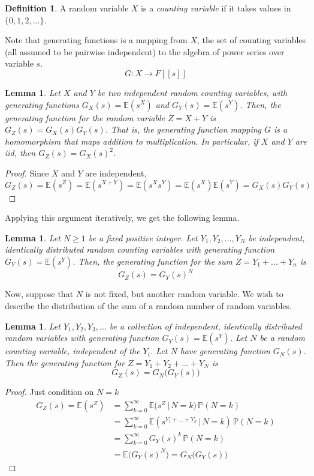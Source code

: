 \documentclass{article}
\newtheorem{lemma}[theorem]{Lemma}
\theoremstyle{remark}
\theoremstyle{definition}
\newtheorem{definition}{Definition}[section]
\begin{document}
\begin{definition}
A random variable $X$ is a \textit{counting variable} if it takes values in $\{0, 1, 2, ...\}$. 
\end{definition}

Note that generating functions is a mapping from $X$, the set of counting variables (all assumed to be pairwise independent) to the algebra of power series over variable $s$.
\[G: X \longrightarrow F[[s]]\]

\begin{lemma}
Let $X$ and $Y$ be two independent random counting variables, with generating functions $G_X (s) = \mathbb{E}(s^X)$ and $G_Y (s) = \mathbb{E}(s^Y)$. Then, the generating function for the random variable $Z = X + Y$ is $G_Z(s) = G_X (s) G_Y (s)$. That is, the generating function mapping $G$ is a homomorphism that maps addition to multiplication. In particular, if $X$ and $Y$ are iid, then $G_Z (s) = G_X (s)^2$. 
\end{lemma}
\begin{proof}
Since $X$ and $Y$ are independent, 
\[G_Z (s) = \mathbb{E}(s^Z) = \mathbb{E}(s^{X+Y}) = \mathbb{E}(s^X s^Y) = \mathbb{E}(s^X) \mathbb{E}(s^Y) = G_X (s) G_Y (s)\]
\end{proof}

Applying this argument iteratively, we get the following lemma. 
\begin{lemma}
Let $N \geq 1$ be a fixed positive integer. Let $Y_1, Y_2, ..., Y_N$ be independent, identically distributed random counting variables with generating function $G_Y (s) = \mathbb{E}(s^Y)$. Then, the generating function for the sum $Z = Y_1 + ... + Y_n$ is 
\[G_Z (s) = G_Y (s)^N\]
\end{lemma}

Now, suppose that $N$ is not fixed, but another random variable. We wish to describe the distribution of the sum of a random number of random variables. 

\begin{lemma}
Let $Y_1, Y_2, Y_3, ...$ be a collection of independent, identically distributed random variables with generating function $G_Y (s) = \mathbb{E}(s^Y)$. Let $N$ be a random counting variable, independent of the $Y_i$. Let $N$ have generating function $G_N (s)$. Then the generating function for $Z = Y_1 + Y_2 + ... + Y_N$ is 
\[G_Z (s) = G_N \big( G_Y (s) \big)\]
\end{lemma}
\begin{proof}
Just condition on $N = k$ 
\begin{align*}
    G_Z (s) = \mathbb{E}(s^Z) & = \sum_{k=0}^\infty \mathbb{E}\big( s^Z \,|\, N=k\big) \, \mathbb{P}(N=k) \\
    & = \sum_{k=0}^\infty \mathbb{E}(s^{Y_1 + ... + Y_k} \,|\,N=k) \, \mathbb{P}(N=k) \\
    & = \sum_{k=0}^\infty G_Y (s)^k \, \mathbb{P}(N=k) \\
    & = \mathbb{E}\big( G_Y (s)^N \big) = G_N \big( G_Y (s) \big)
\end{align*}
\end{proof}
\end{document}
